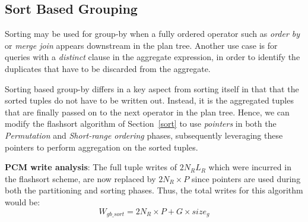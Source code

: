\subsection{Sort Based Grouping}

Sorting may be used for group-by when a fully ordered operator such
as \textit{order by} or \textit{merge join} appears downstream in the plan
tree. Another use case is for queries with a \textit{distinct} clause
in the aggregate expression, in order to identify the duplicates that have
to be discarded from the aggregate.  

Sorting based group-by differs in a key aspect from sorting itself
in that that the sorted tuples do not have to be written out. Instead, it
is the aggregated tuples that are finally passed on to the next operator
in the plan tree. Hence, we can modify the flashsort algorithm of
Section~\ref{sort} to use \emph{pointers} in both the
\textit{Permutation} and \textit{Short-range ordering} phases, subsequently leveraging these
pointers to perform aggregation on the sorted tuples. 

\textbf{PCM write analysis}: The full tuple writes of $2 N_R L_R$
which were incurred in the flashsort scheme, are
now replaced by $2N_R \times P$ since pointers are used during
both the partitioning and sorting phases. Thus, the total writes for this
algorithm would be:
\begin{equation}
\label{eq:gby_ptr_mpivot}
W_{gb\_sort} = 2N_R \times P + G \times size_g
\end{equation}